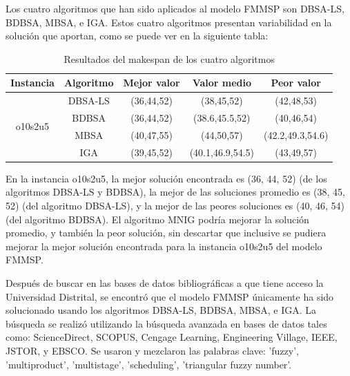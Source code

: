 \documentclass{article}
\begin{document}
\vspace{\baselineskip}
Los cuatro algoritmos que han sido aplicados al modelo FMMSP son DBSA-LS, BDBSA, MBSA, e IGA. Estos cuatro algoritmos presentan variabilidad en la solución que aportan, como se puede ver en la siguiente tabla:

\vspace{\baselineskip}
\begin{table}[h]
    \caption{Resultados del makespan de los cuatro algoritmos}
    \label{tab:algs0}
    \begin{center}
    \begin{tabular}{ccccc}
        \hline
        Instancia & Algoritmo & Mejor valor & Valor medio & Peor valor\\
        \hline
        \multirow{4}{*}{o10s2u5} & DBSA-LS & (36,44,52) & (38,45,52) & (42,48,53)\\
         & BDBSA & (36,44,52) & (38.6,45.5,52) & (40,46,54)\\
         & MBSA & (40,47,55) & (44,50,57) & (42.2,49.3,54.6)\\
         & IGA & (39,45,52) & (40.1,46.9,54.5) & (43,49,57)\\
        \hline
    \end{tabular}
    \end{center}
\end{table}

\vspace{\baselineskip}
En la instancia o10s2u5, la mejor solución encontrada es (36, 44, 52) (de los algoritmos DBSA-LS y BDBSA), la mejor de las soluciones promedio es (38, 45, 52) (del algoritmo DBSA-LS), y la mejor de las peores soluciones es (40, 46, 54) (del algoritmo BDBSA). El algoritmo MNIG podría mejorar la solución promedio, y también la peor solución, sin descartar que inclusive se pudiera mejorar la mejor solución encontrada para la instancia o10s2u5 del modelo FMMSP.

\vspace{\baselineskip}
Después de buscar en las bases de datos bibliográficas a que tiene acceso la Universidad Distrital, se encontró que el modelo FMMSP únicamente ha sido solucionado usando los algoritmos DBSA-LS, BDBSA, MBSA, e IGA. La búsqueda se realizó utilizando la búsqueda avanzada en bases de datos tales como: ScienceDirect, SCOPUS, Cengage Learning, Engineering Village, IEEE, JSTOR, y EBSCO. Se usaron y mezclaron las palabras clave: 'fuzzy', 'multiproduct', 'multistage', 'scheduling', 'triangular fuzzy number'.
\end{document}
